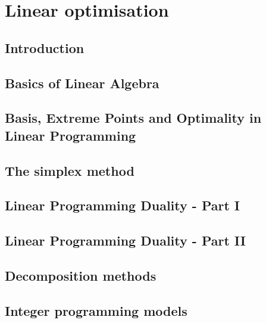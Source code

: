 \documentclass{bookest}
\begin{document}
	

	\tableofcontents
	
	\part{Linear optimisation}
	
	\chapter{Introduction} \label{chapter_1}
	
	
	\chapter{Basics of Linear Algebra} \label{chapter_2}
	
	
	\chapter{Basis, Extreme Points and Optimality in Linear Programming} \label{chapter_3}
		 
	
	\chapter{The simplex method} \label{chapter_4}
		
		
	\chapter{Linear Programming Duality - Part I} \label{chapter_5}
		
	
	\chapter{Linear Programming Duality - Part II} \label{chapter_6}
	
	
	\chapter{Decomposition methods} \label{chapter_7}
	
	
	\chapter{Integer programming models} \label{chapter_8}
	
	
\end{document}

